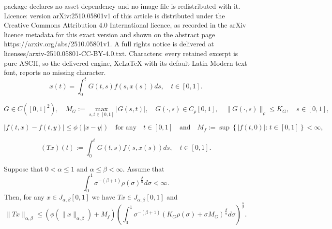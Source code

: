 \documentclass[10pt,a4paper]{amsart}
\begin{document}
package declares no asset dependency and no image file is redistributed with it. Licence: version arXiv:2510.05801v1 of this article is distributed under the Creative Commons Attribution 4.0 International licence, as recorded in the arXiv licence metadata for this exact version and shown on the abstract page https://arxiv.org/abs/2510.05801v1. A full rights notice is delivered at licenses/arxiv-2510.05801-CC-BY-4.0.txt. Characters: every retained excerpt is pure ASCII, so the delivered engine, XeLaTeX with its default Latin Modern text font, reports no missing character.
\begin{equation}\label{eqn:MainEq}
	x(t) = \int_0^t G(t,s) f(s, x(s)) ds, \quad t \in[0,1].
\end{equation}

\begin{equation}\label{eqn:AssumG}
	\tag{H1}
	G \in C([0,1]^2), \quad M_G := \max_{s,t\in[0,1]} |G(s,t)|, \quad G(\cdot, s) \in C_\rho[0,1], \quad \|G(\cdot, s)\|_\rho \leq K_G, \quad s \in [0,1],
\end{equation}

\begin{equation}\label{eqn:AssumF}
	\tag{H2}
	|f(t,x) - f(t, y)| \leq \phi(|x-y|) \quad \text{for any} \quad t \in [0,1] \quad \text{and}\quad M_f := \sup\left\{|f(t,0)|: \, t\in[0,1]\right\} < \infty,
\end{equation}

\begin{equation}\label{eqn:OpeartorT}
	(Tx)(t) := \int_0^t G(t,s) f(s, x(s)) ds, \quad t \in [0,1].
\end{equation}

\begin{prop}\label{prop:TNorm}
	Suppose that $0<\alpha\leq 1$ and $\alpha \leq \beta < \infty$. Assume that
	\begin{equation}\label{eqn:AssumRho}
		\int_0^1 \sigma^{-(\beta+1)} \rho(\sigma)^\frac{\beta}{\alpha} d\sigma < \infty.
	\end{equation}
	Then, for any $x \in J_{\alpha,\beta}[0,1]$ we have $Tx \in J_{\alpha,\beta}[0,1]$ and
	\begin{equation}\label{eqn:TNorm}
		\|Tx\|_{\alpha,\beta} \leq \left(\phi(\|x\|_{\alpha,\beta}) + M_f\right)  \left(\int_0^1 \sigma^{-(\beta+1)} \left(K_G\rho(\sigma) + \sigma M_G \right)^\frac{\beta}{\alpha} d\sigma\right)^\frac{\alpha}{\beta}.
	\end{equation}
\end{prop}
\end{document}

